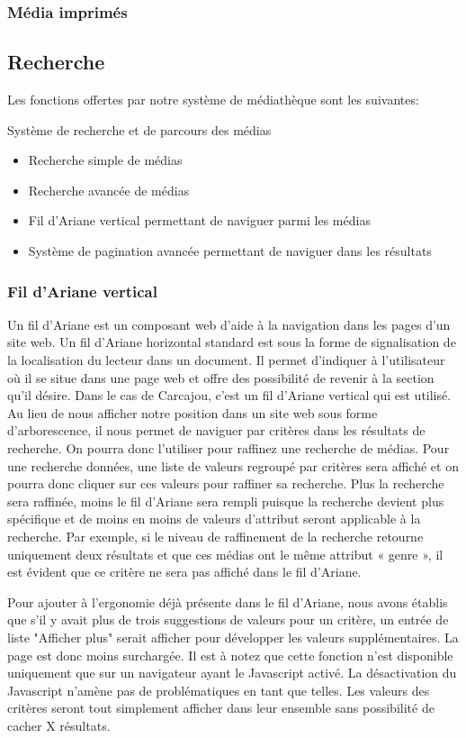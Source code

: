 \documentclass[letter, 11pt]{report}
\begin{document}
\subsubsection{Média imprimés}

\subsection{Recherche}

Les fonctions offertes par notre système de médiathèque sont les suivantes:

Système de recherche et de parcours des médias
\begin{itemize}
	\item Recherche simple de médias
	\item Recherche avancée de médias
	\item Fil d'Ariane vertical permettant de naviguer parmi les médias
	\item Système de pagination avancée permettant de naviguer dans les résultats
\end{itemize}

\subsubsection{Fil d'Ariane vertical}
Un fil d'Ariane est un composant web d'aide à la navigation dans les pages d'un site web. Un fil d'Ariane horizontal standard est sous la forme de signalisation de la localisation du lecteur dans un document. Il permet d'indiquer à l'utilisateur où il se situe dans une page web et offre des possibilité de revenir à la section qu'il désire.  Dans le cas de Carcajou, c'est un fil d'Ariane vertical qui est utilisé. Au lieu de nous afficher notre position dans un site web sous forme d'arborescence, il nous permet de naviguer par critères dans les résultats de recherche. On pourra donc l'utiliser pour raffinez une recherche de médias. Pour une recherche données, une liste de valeurs regroupé par critères sera affiché et on pourra donc cliquer sur ces valeurs pour raffiner sa recherche. Plus la recherche sera raffinée, moins le fil d'Ariane sera rempli puisque la recherche devient plus spécifique et de moins en moins de valeurs d'attribut seront applicable à la recherche. Par exemple, si le niveau de raffinement de la recherche retourne uniquement deux résultats et que ces médias ont le même attribut « genre », il est évident que ce critère ne sera pas affiché dans le fil d'Ariane.

Pour ajouter à l'ergonomie déjà présente dans le fil d'Ariane, nous avons établis que s'il y avait plus de trois suggestions de valeurs pour un critère, un entrée de liste "Afficher plus" serait afficher pour développer les valeurs supplémentaires. La page est donc moins surchargée. Il est à notez que cette fonction n'est disponible uniquement que sur un navigateur ayant le Javascript activé. La désactivation du Javascript n'amène pas de problématiques en tant que telles. Les valeurs des critères seront tout simplement afficher dans leur ensemble sans possibilité de cacher X résultats.
\end{document}
